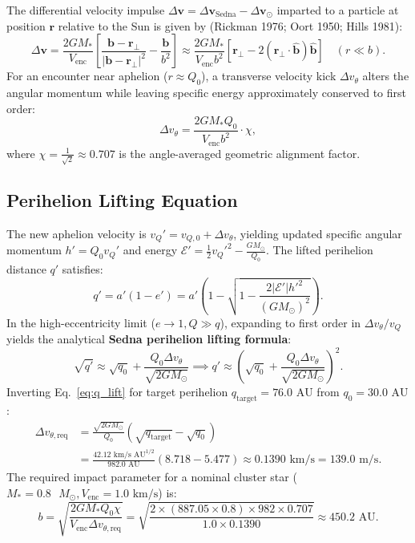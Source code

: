 \documentclass[11pt,a4paper]{article}
\begin{document}
The differential velocity impulse $\Delta \mathbf{v} = \Delta \mathbf{v}_{\text{Sedna}} - \Delta \mathbf{v}_\odot$ imparted to a particle at position $\mathbf{r}$ relative to the Sun is given by (Rickman 1976; Oort 1950; Hills 1981):
\begin{equation}
\Delta \mathbf{v} = \frac{2 G M_*}{V_{\text{enc}}} \left[ \frac{\mathbf{b} - \mathbf{r}_\perp}{|\mathbf{b} - \mathbf{r}_\perp|^2} - \frac{\mathbf{b}}{b^2} \right] \approx \frac{2 G M_*}{V_{\text{enc}} b^2} \left[ \mathbf{r}_\perp - 2 (\mathbf{r}_\perp \cdot \hat{\mathbf{b}}) \hat{\mathbf{b}} \right] \quad (r \ll b).
\end{equation}
For an encounter near aphelion ($r \approx Q_0$), a transverse velocity kick $\Delta v_\theta$ alters the angular momentum while leaving specific energy approximately conserved to first order:
\begin{equation}
\Delta v_\theta = \frac{2 G M_* Q_0}{V_{\text{enc}} b^2} \cdot \chi,
\end{equation}
where $\chi = \frac{1}{\sqrt{2}} \approx 0.707$ is the angle-averaged geometric alignment factor.

\subsection{Perihelion Lifting Equation}
The new aphelion velocity is $v_Q' = v_{Q,0} + \Delta v_\theta$, yielding updated specific angular momentum $h' = Q_0 v_Q'$ and energy $\mathcal{E}' = \frac{1}{2} {v_Q'}^2 - \frac{G M_\odot}{Q_0}$. The lifted perihelion distance $q'$ satisfies:
\begin{equation}
q' = a' (1 - e') = a' \left( 1 - \sqrt{1 - \frac{2 |\mathcal{E}'| {h'}^2}{(G M_\odot)^2}} \right).
\end{equation}
In the high-eccentricity limit ($e \to 1, Q \gg q$), expanding to first order in $\Delta v_\theta / v_Q$ yields the analytical \textbf{Sedna perihelion lifting formula}:
\begin{equation}
\sqrt{q'} \approx \sqrt{q_0} + \frac{Q_0 \Delta v_\theta}{\sqrt{2 G M_\odot}} \implies q' \approx \left( \sqrt{q_0} + \frac{Q_0 \Delta v_\theta}{\sqrt{2 G M_\odot}} \right)^2.
\label{eq:q_lift}
\end{equation}
Inverting Eq.~\eqref{eq:q_lift} for target perihelion $q_{\text{target}} = 76.0\text{ AU}$ from $q_0 = 30.0\text{ AU}$:
\begin{align}
\Delta v_{\theta,\text{req}} &= \frac{\sqrt{2 G M_\odot}}{Q_0} \left( \sqrt{q_{\text{target}}} - \sqrt{q_0} \right) \nonumber \\
&= \frac{42.12\text{ km/s AU}^{1/2}}{982.0\text{ AU}} (8.718 - 5.477) \approx 0.1390\text{ km/s} = 139.0\text{ m/s}.
\end{align}
The required impact parameter for a nominal cluster star ($M_* = 0.8\text{ }M_\odot, V_{\text{enc}} = 1.0\text{ km/s}$) is:
\begin{equation}
b = \sqrt{\frac{2 G M_* Q_0 \chi}{V_{\text{enc}} \Delta v_{\theta,\text{req}}}} = \sqrt{\frac{2 \times (887.05 \times 0.8) \times 982 \times 0.707}{1.0 \times 0.1390}} \approx 450.2\text{ AU}.
\end{equation}
\end{document}
